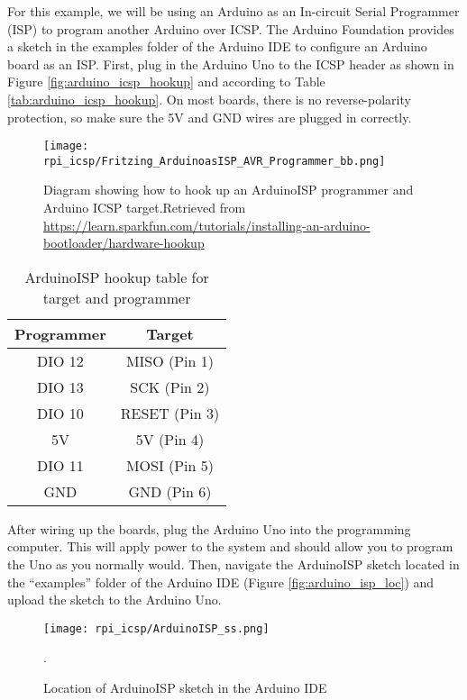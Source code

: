 For this example, we will be using an Arduino as an In-circuit Serial Programmer (ISP) to program another Arduino over 
ICSP. The Arduino Foundation provides a sketch in the examples folder of the Arduino IDE to configure an Arduino board 
as an ISP. First, plug in the Arduino Uno to the ICSP header as shown in Figure \ref{fig:arduino_icsp_hookup} and according to Table \ref{tab:arduino_icsp_hookup}. On most boards, there is no reverse-polarity protection, so make sure the 5V and GND wires are plugged in correctly. 

\begin{figure}
    \texttt{[image: rpi\_icsp/Fritzing\_ArduinoasISP\_AVR\_Programmer\_bb.png]}
    \caption[ArduinoISP Hookup Diagram]{Diagram showing how to hook up an ArduinoISP programmer and Arduino ICSP target.Retrieved from \url{https://learn.sparkfun.com/tutorials/installing-an-arduino-bootloader/hardware-hookup}}
\end{figure}

\begin{table}[h!]
    \caption[ArduinoISP Hookup Guide]{ArduinoISP hookup table for target and programmer}
    \begin{tabular}{ c | c }
        \toprule
        Programmer & Target \\

        \midrule
        DIO 12  & MISO (Pin 1)  \\
        DIO 13  & SCK (Pin 2)   \\
        DIO 10  & RESET (Pin 3) \\
        5V      & 5V (Pin 4)    \\
        DIO 11  & MOSI (Pin 5)  \\
        GND     & GND (Pin 6)   \\

        \bottomrule
    \end{tabular}
\end{table}

After wiring up the boards, plug the Arduino Uno into the programming computer. This will apply power to the system and should allow you to program the Uno as you normally would. Then, navigate the ArduinoISP sketch located in the “examples” folder of the Arduino IDE (Figure \ref{fig:arduino_isp_loc}) and upload the sketch to the Arduino Uno.

\begin{figure}
    \texttt{[image: rpi\_icsp/ArduinoISP\_ss.png]}
    \caption[ArduinoISP Example]{Location of ArduinoISP sketch in the Arduino IDE}.
\end{figure}

